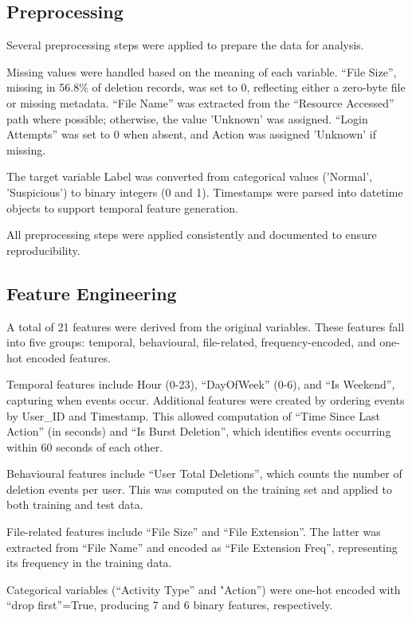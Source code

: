 \subsection{Preprocessing}
Several preprocessing steps were applied to prepare the data for analysis.

Missing values were handled based on the meaning of each variable. “File Size”, missing in 56.8\% of deletion records, was set to 0, reflecting either a zero-byte file or missing metadata. “File Name” was extracted from the “Resource Accessed” path where possible; otherwise, the value 'Unknown' was assigned. “Login Attempts” was set to 0 when absent, and Action was assigned 'Unknown' if missing.

The target variable Label was converted from categorical values ('Normal', 'Suspicious') to binary integers (0 and 1). Timestamps were parsed into datetime objects to support temporal feature generation.

All preprocessing steps were applied consistently and documented to ensure reproducibility.



\subsection{Feature Engineering}
A total of 21 features were derived from the original variables. These features fall into five groups: temporal, behavioural, file-related, frequency-encoded, and one-hot encoded features.

Temporal features include Hour (0-23), “DayOfWeek” (0-6), and “Is Weekend”, capturing when events occur. Additional features were created by ordering events by User\_ID and Timestamp. This allowed computation of “Time Since Last Action” (in seconds) and “Is Burst Deletion”, which identifies events occurring within 60 seconds of each other.

Behavioural features include “User Total Deletions”, which counts the number of deletion events per user. This was computed on the training set and applied to both training and test data.

File-related features include “File Size” and “File Extension”. The latter was extracted from “File Name” and encoded as “File Extension Freq”, representing its frequency in the training data.

Categorical variables (“Activity Type” and "Action”) were one-hot encoded with “drop first”=True, producing 7 and 6 binary features, respectively.

